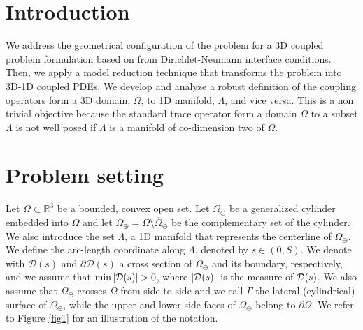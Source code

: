 \documentclass[r]{siamart171218}
\begin{document}
\section{Introduction}\label{sec:intro}

We address the geometrical configuration of the problem for a 3D coupled problem formulation based on from Dirichlet-Neumann interface conditions. Then, we apply a model reduction technique that transforms the problem into 3D-1D coupled PDEs. We develop and analyze a robust definition of the coupling operators form a 3D domain, $\Omega$, to 1D manifold, $\Lambda$, and vice versa. This is a non trivial objective because the standard trace operator form a domain $\Omega$ to a subset $\Lambda$ is not well posed if $\Lambda$ is a manifold of co-dimension two of $\Omega$.

\section{Problem setting}\label{sec:setting}

Let $\Omega \subset \mathbb{R}^3$ be a bounded, convex open set. Let $\Omega_\ominus$ be a generalized cylinder embedded into $\Omega$ and let $\Omega_\oplus = \Omega \setminus \overline{\Omega}_\ominus$ be the complementary set of the cylinder. We also introduce the set $\Lambda$, a 1D manifold that represents the centerline of $\Omega_\ominus$. We define the arc-length coordinate along $\Lambda$, denoted by $s \in (0,S)$. We denote with $\mathcal{D}(s)$ and $\partial\mathcal{D}(s)$ a cross section of $\Omega_\ominus$ and its boundary, respectively, and we assume that $\min |\mathcal{D} (s)| >0$, where $|\mathcal{D} (s)|$ is the measure of $\mathcal{D} (s)$. 
We also assume that $\Omega_\ominus$ crosses $\Omega$ from side to side and we call $\Gamma$ the lateral (cylindrical) surface of $\Omega_\ominus$, while the upper and lower side faces of $\Omega_\ominus$ belong to $\partial\Omega$. We refer to Figure \ref{fig1} for an illustration of the notation. 
\end{document}
